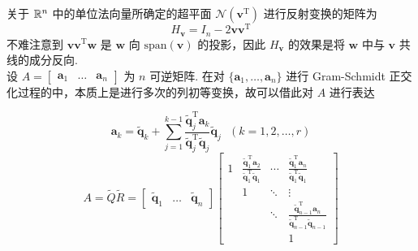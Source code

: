 \documentclass[./main.tex]{subfiles}
\begin{document}
关于 $\mathbb{R}^{n}$ 中的单位法向量所确定的超平面 $\mathcal{N}(\bm{v}^{\mathrm{T}})$ 进行反射变换的矩阵为
\begin{equation}
    H_{\bm{v}}=I_n-2\bm{v}\bm{v}^{\mathrm{T}}
\end{equation}
不难注意到 $\bm{v}\bm{v}^{\mathrm{T}}\bm{w}$ 是 $\bm{w}$ 向 $\mathrm{span}(\bm{v})$ 的投影，因此 $H_{\bm{v}}$ 的效果是将 $\bm{w}$ 中与 $\bm{v}$ 共线的成分反向. \\

设 $A=\begin{bmatrix}\bm{a}_1&\dots&\bm{a}_n\end{bmatrix}$ 为 $n$ 可逆矩阵. 在对 $\{\bm{a}_1,\dots,\bm{a}_n\}$ 进行 Gram-Schmidt 正交化过程的中，本质上是进行多次的列初等变换，故可以借此对 $A$ 进行表达

\begin{equation}
    \bm{a}_k=\bm{\widetilde{q}}_k+\sum_{j=1}^{k-1}\frac{\bm{\widetilde{q}}_j^{\mathrm{T}}\bm{a}_k}{\bm{\widetilde{q}}_j^{\mathrm{T}}\bm{\widetilde{q}}_j}\bm{\widetilde{q}}_j \ \ \ (k=1,2,\dots,r)
\end{equation}
\begin{equation}
    A=\widetilde{Q}\widetilde{R}=\begin{bmatrix}\widetilde{\bm{q}}_1&\dots&\widetilde{\bm{q}}_n\end{bmatrix}
    \begin{bmatrix}
        1 & \frac{\widetilde{\bm{q}}_1^{\mathrm{T}}\bm{a}_2}{\widetilde{\bm{q}}_1^{\mathrm{T}}\widetilde{\bm{q}}_1} & \cdots & \frac{\widetilde{\bm{q}}_1^{\mathrm{T}}\bm{a}_n}{\widetilde{\bm{q}}_1^{\mathrm{T}}\widetilde{\bm{q}}_1}             \\
          & 1                                                                                                       & \ddots & \vdots                                                                                                              \\
          &                                                                                                         & \ddots & \frac{\widetilde{\bm{q}}_{n-1}^{\mathrm{T}}\bm{a}_n}{\widetilde{\bm{q}}_{n-1}^{\mathrm{T}}\widetilde{\bm{q}}_{n-1}} \\
          &                                                                                                         &        & 1
    \end{bmatrix}
\end{equation}
\end{document}
